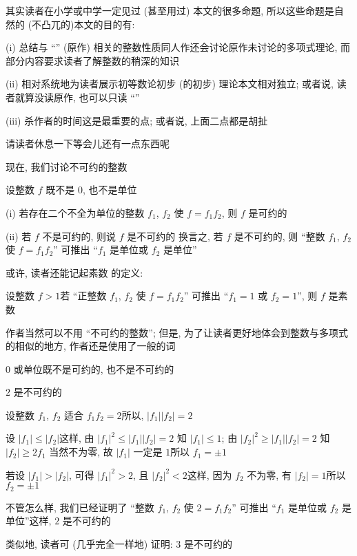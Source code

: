 \begin{remark}
    其实读者在小学或中学一定见过 (甚至用过) 本文的很多命题, 所以这些命题是自然的 (不凸兀的)\period 本文的目的有:

    (i) 总结与 ``\HEADING '' (原作) 相关的整数性质\period 同人作还会讨论原作未讨论的多项式理论, 而部分内容要求读者了解整数的稍深的知识\period

    (ii) 相对系统地为读者展示初等数论初步 (的初步) 理论\period 本文相对独立; 或者说, 读者就算没读原作, 也可以只读 ``\SomePropertiesOfIntegers ''\period

    (iii) 杀作者的时间\period 这是最重要的点; 或者说, 上面二点都是胡扯\period

    请读者休息一下\period 等会儿还有一点东西呢\period
\end{remark}

\myLine

现在, 我们讨论不可约的整数\period

\begin{definition}
    设整数 $f$ 既不是 $0$, 也不是单位\period

    (i) 若存在二个不全为单位的整数 $f_1$, $f_2$ 使 $f = f_1 f_2$, 则 $f$ 是可约的 \period

    (ii) 若 $f$ 不是可约的, 则说 $f$ 是不可约的 \period 换言之, 若 $f$ 是不可约的, 则 ``整数 $f_1$, $f_2$ 使 $f = f_1 f_2$'' 可推出 ``$f_1$ 是单位或 $f_2$ 是单位''\period
\end{definition}

\begin{remark}
    或许, 读者还能记起素数  的定义:

    设整数 $f > 1$\period 若 ``正整数 $f_1$, $f_2$ 使 $f = f_1 f_2$'' 可推出 ``$f_1 = 1$ 或 $f_2 = 1$'', 则 $f$ 是素数\period

    作者当然可以不用 ``不可约的整数''; 但是, 为了让读者更好地体会到整数与多项式的相似的地方, 作者还是使用了一般的词\period
\end{remark}

\begin{remark}
    $0$ 或单位既不是可约的, 也不是不可约的\period
\end{remark}

\begin{example}
    $2$ 是不可约的\period

    设整数 $f_1$, $f_2$ 适合 $f_1 f_2 = 2$\period 所以, $|f_1| |f_2| = 2$\period

    设 $|f_1| \leq |f_2|$\period 这样, 由 $|f_1|^2 \leq |f_1| |f_2| = 2$ 知 $|f_1| \leq 1$; 由 $|f_2|^2 \geq |f_1| |f_2| = 2$ 知 $|f_2| \geq 2$\period $f_1$ 当然不为零, 故 $|f_1|$ 一定是 $1$\period 所以 $f_1 = \pm 1$\period

    若设 $|f_1| > |f_2|$, 可得 $|f_1|^2 > 2$, 且 $|f_2|^2 < 2$\period 这样, 因为 $f_2$ 不为零, 有 $|f_2| = 1$\period 所以 $f_2 = \pm 1$\period

    不管怎么样, 我们已经证明了 ``整数 $f_1$, $f_2$ 使 $2 = f_1 f_2$'' 可推出 ``$f_1$ 是单位或 $f_2$ 是单位''\period 这样, $2$ 是不可约的\period

    类似地, 读者可 (几乎完全一样地) 证明: $3$ 是不可约的\period
\end{example}

